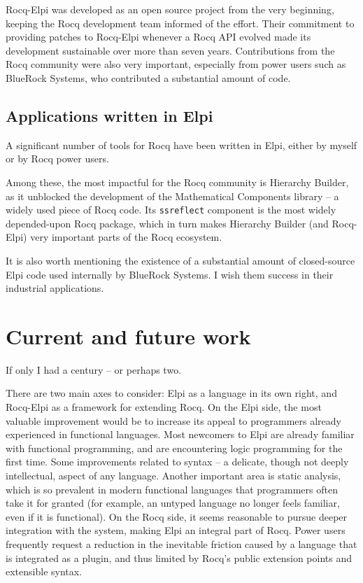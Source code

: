 \documentclass{these-ISSS}
\begin{document}
Rocq-Elpi was developed as an open source project from the very beginning,
keeping the Rocq development team informed of the effort. Their commitment to
providing patches to Rocq-Elpi whenever a Rocq API evolved made its development
sustainable over more than seven years. Contributions from the Rocq community
were also very important, especially from power users such as BlueRock Systems,
who contributed a substantial amount of code.

\subsection{Applications written in Elpi}

A significant number of tools for Rocq have been written in Elpi, either by
myself or by Rocq power users.

Among these, the most impactful for the Rocq community is Hierarchy Builder, as
it unblocked the development of the Mathematical Components library -- a
widely used piece of Rocq code. Its \texttt{ssreflect} component is the most widely
depended-upon Rocq package, which in turn makes Hierarchy Builder (and
Rocq-Elpi) very important parts of the Rocq ecosystem.

It is also worth mentioning the existence of a substantial amount of
closed-source Elpi code used internally by BlueRock Systems. I wish them
success in their industrial applications.

\section{Current and future work}

If only I had a century -- or perhaps two. 

There are two main axes to consider:
Elpi as a language in its own right, and Rocq-Elpi as a framework for extending
Rocq. On the Elpi side, the most valuable improvement would be to increase its
appeal to programmers already experienced in functional languages. Most
newcomers to Elpi are already familiar with functional programming, and are
encountering logic programming for the first time. Some improvements related to
syntax -- a delicate, though not deeply intellectual, aspect of any language.
Another important area is static analysis, which is so prevalent in modern
functional languages that programmers often take it for granted (for example,
an untyped language no longer feels familiar, even if it is functional). On the
Rocq side, it seems reasonable to pursue deeper integration with the system,
making Elpi an integral part of Rocq. Power users frequently request a
reduction in the inevitable friction caused by a language that is integrated as
a plugin, and thus limited by Rocq’s public extension points and extensible
syntax.
\end{document}
